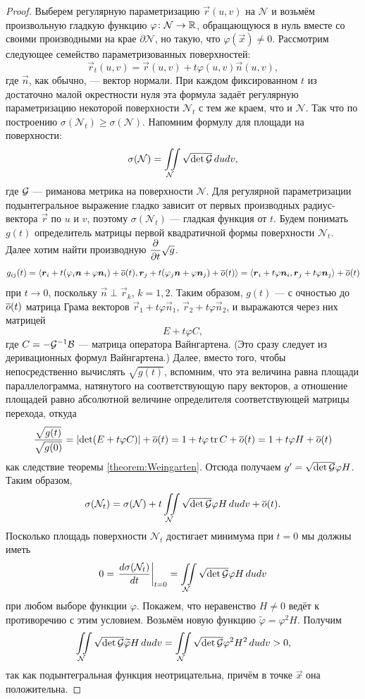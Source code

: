 \begin{proof}
	Выберем регулярную параметризацию $\vec{r}(u, v)$ на $\mathcal{N}$ и возьмём произвольную гладкую функцию $\varphi\colon \mathcal{N} \to \mathbb{R}$, обращающуюся в нуль вместе со своими производными на крае $\partial\mathcal{N}$, но такую, что $\varphi(\vec{x}) \ne 0$. Рассмотрим следующее семейство параметризованных поверхностей:
	\[
		\vec{r}_t(u, v) = \vec{r}(u, v) + t\varphi(u, v)\vec{n}(u, v),
	\]
	где $\vec{n}$, как обычно, --- вектор нормали. При каждом фиксированном $t$ из достаточно малой окрестности нуля эта формула задаёт регулярную параметризацию некоторой поверхности $\mathcal{N}_t$ с тем же краем, что и $\mathcal{N}$. Так что по построению $\sigma(\mathcal{N}_t) \geqslant \sigma(\mathcal{N})$. Напомним формулу для площади на поверхности:
	\[
		\sigma(\mathcal{N}) = \iint\limits_{\mathcal{N}}\sqrt{\det\mathcal{G}}\,dudv,
	\]
	где $\mathcal{G}$ --- риманова метрика на поверхности $\mathcal{N}$. Для регулярной параметризации подынтегральное выражение гладко зависит от первых производных радиус-вектора $\vec{r}$ по $u$ и $v$, поэтому $\sigma(\mathcal{N}_t)$ --- гладкая функция от $t$. Будем понимать $g(t)$ определитель матрицы первой квадратичной формы поверхности $\mathcal{N}_t$. Далее хотим найти производную $\displaystyle\frac{\partial}{\partial t}\sqrt{g}$.
	\[
		g_{ij}(t) = \langle\boldsymbol{r}_i + t(\varphi_i\boldsymbol{n} + \varphi\boldsymbol{n}_i) + \overline{o}(t), \boldsymbol{r}_j + t(\varphi_j\boldsymbol{n} + \varphi\boldsymbol{n}_j) + \overline{o}(t)\rangle = \langle\boldsymbol{r}_i + t\varphi\boldsymbol{n}_i, \boldsymbol{r}_j + t\varphi\boldsymbol{n}_j\rangle + \overline{o}(t)
	\]
	при $t \to 0$, поскольку $\vec{n} \perp \vec{r}_k$, $k = 1, 2$. Таким образом, $g(t)$ --- с очностью до $\overline{o}(t)$ матрица Грама векторов $\vec{r}_1 + t\varphi\vec{n}_1$, $\vec{r}_2 + t\varphi\vec{n}_2$, и выражаются через них матрицей
	\[
		E + t\varphi C,
	\]
	где $C = -\mathcal{G}^{-1}\mathcal{B}$ --- матрица оператора Вайнгартена. (Это сразу следует из деривационных формул Вайнгартена.) Далее, вместо того, чтобы непосредственно вычислять $\sqrt{g(t)}$, вспомним, что эта величина равна площади параллелограмма, натянутого на соответствующую пару векторов, а отношение площадей равно абсолютной величине определителя соответствующей матрицы перехода, откуда
	\[
		\frac{\sqrt{g(t)}}{\sqrt{g(0)}} = \left\lvert\det(E + t\varphi C)\right\rvert + \overline{o}(t) = 1 + t\varphi\operatorname{tr} C + \overline{o}(t) = 1 + t\varphi H + \overline{o}(t)
	\]
	как следствие теоремы \ref{theorem:Weingarten}. Отсюда получаем $g^\prime = \sqrt{\det \mathcal{G}}\varphi H$. Таким образом,
	\[
		\sigma(\mathcal{N}_t) = \sigma(\mathcal{N}) + t\iint\limits_{\mathcal{N}}\sqrt{\det \mathcal{G}}\varphi H\,dudv + \overline{o}(t).
	\]
	Посколько площадь поверхности $\mathcal{N}_t$ достигает минимума при $t = 0$ мы должны иметь
	\[
		0 = \left.\frac{d\sigma(\mathcal{N}_t)}{dt}\right|_{t = 0} = \iint\limits_{\mathcal{N}}\sqrt{\det \mathcal{G}}\varphi H\,dudv
	\]
	при любом выборе функции $\varphi$. Покажем, что неравенство $H \ne 0$ ведёт к противоречию с этим условием. Возьмём новую функцию $\widetilde{\varphi} = \varphi^2H$. Получим
	\[
		\iint\limits_{\mathcal{N}}\sqrt{\det \mathcal{G}}\widetilde{\varphi}H\,dudv = \iint\limits_{\mathcal{N}}\sqrt{\det\mathcal{G}}\varphi^2H^2\,dudv > 0,
	\]
	так как подынтегральная функция неотрицательна, причём в точке $\vec{x}$ она положительна.
\end{proof}

